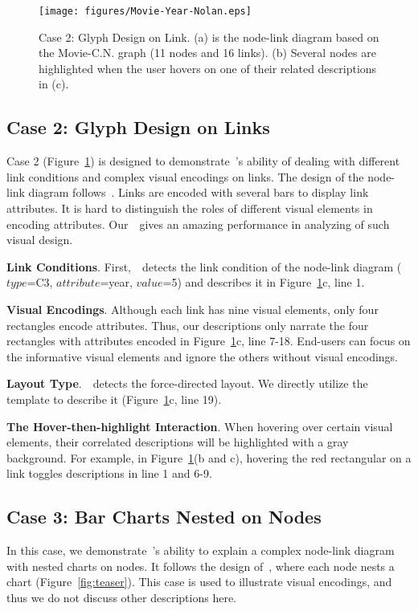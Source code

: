 \begin{figure}[tp]
    \centering
    \texttt{[image: figures/Movie-Year-Nolan.eps]}
    \setlength{\abovecaptionskip}{-5pt}
    \setlength{\belowcaptionskip}{-10pt}
    \caption{Case 2: Glyph Design on Link. (a) is the node-link diagram based on the Movie-C.N. graph (11 nodes and 16 links). (b) Several nodes are highlighted when the user hovers on one of their related descriptions in (c).}\label{fig:Movie-Year-Nolan}
\end{figure}

\subsection{Case 2: Glyph Design on Links}
Case 2 (Figure~\ref{fig:Movie-Year-Nolan}) is designed to demonstrate~\ApproachName's ability of dealing with different link conditions and complex visual encodings on links. The design of the node-link diagram follows~\cite{DBLP:conf/iv/SchoffelSE16}. Links are encoded with several bars to display link attributes. It is hard to distinguish the roles of different visual elements in encoding attributes. Our~\ApproachName~gives an amazing performance in analyzing of such visual design.

\noindent \textbf{Link Conditions}. 
First,~\ApproachName~detects the link condition of the node-link diagram ($type$=C3, $attribute$=year, $value$=5) and describes it in Figure~\ref{fig:Movie-Year-Nolan}c, line 1.

\noindent \textbf{Visual Encodings}. 
Although each link has nine visual elements, only four rectangles encode attributes.
Thus, our descriptions only narrate the four rectangles with attributes encoded in Figure~\ref{fig:Movie-Year-Nolan}c, line 7-18.
End-users can focus on the informative visual elements and ignore the others without visual encodings.

\noindent \textbf{Layout Type}.~\ApproachName~detects the force-directed layout. We directly utilize the template to describe it (Figure~\ref{fig:Movie-Year-Nolan}c, line 19).

\noindent \textbf{The Hover-then-highlight Interaction}.
When hovering over certain visual elements, their correlated descriptions will be highlighted with a gray background. For example, in Figure~\ref{fig:Movie-Year-Nolan}(b and c), hovering the red rectangular on a link toggles descriptions in line 1 and 6-9.

\subsection{Case 3: Bar Charts Nested on Nodes}
In this case, we demonstrate~\ApproachName's ability to explain a complex node-link diagram with nested charts on nodes. It follows the design of~\cite{DBLP:journals/bmcbi/JunkerKS06}, where each node nests a chart (Figure~\ref{fig:teaser}). This case is used to illustrate visual encodings, and thus we do not discuss other descriptions here.

